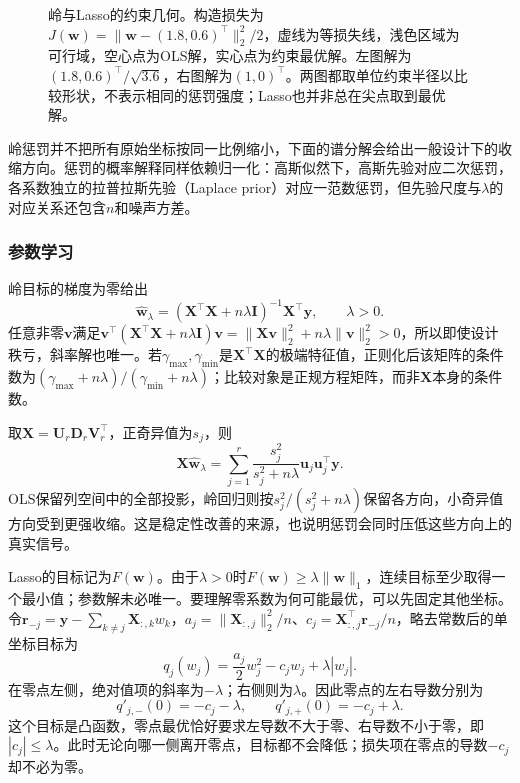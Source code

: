 \begin{figure}[t]
  \centering
  
  \caption{岭与Lasso的约束几何。构造损失为$J(\bm{w})=\lVert\bm{w}-(1.8,0.6)^{\top}\rVert_2^2/2$，虚线为等损失线，浅色区域为可行域，空心点为OLS解，实心点为约束最优解。左图解为$(1.8,0.6)^{\top}/\sqrt{3.6}$，右图解为$(1,0)^{\top}$。两图都取单位约束半径以比较形状，不表示相同的惩罚强度；Lasso也并非总在尖点取到最优解。}
  \label{fig:regression-regularization-geometry}
\end{figure}

岭惩罚并不把所有原始坐标按同一比例缩小，下面的谱分解会给出一般设计下的收缩方向。惩罚的概率解释同样依赖归一化：高斯似然下，高斯先验对应二次惩罚，各系数独立的拉普拉斯先验（Laplace prior）对应一范数惩罚，但先验尺度与$\lambda$的对应关系还包含$n$和噪声方差。

\subsubsection{参数学习}
\label{sec:regression-regularization-learning}

岭目标的梯度为零给出
\begin{equation}
  \widehat{\bm{w}}_{\lambda}
  =(\bm{X}^{\top}\bm{X}+n\lambda\bm{I})^{-1}\bm{X}^{\top}\bm{y},
  \qquad\lambda>0.
  \label{eq:regression-ridge-solution}
\end{equation}
任意非零$\bm{v}$满足$\bm{v}^{\top}(\bm{X}^{\top}\bm{X}+n\lambda\bm{I})\bm{v}=\lVert\bm{X}\bm{v}\rVert_2^2+n\lambda\lVert\bm{v}\rVert_2^2>0$，所以即使设计秩亏，斜率解也唯一。若$\gamma_{\max},\gamma_{\min}$是$\bm{X}^{\top}\bm{X}$的极端特征值，正则化后该矩阵的条件数为$(\gamma_{\max}+n\lambda)/(\gamma_{\min}+n\lambda)$；比较对象是正规方程矩阵，而非$\bm{X}$本身的条件数。

取$\bm{X}=\bm{U}_r\bm{D}_r\bm{V}_r^{\top}$，正奇异值为$s_j$，则
\begin{equation}
  \bm{X}\widehat{\bm{w}}_{\lambda}
  =\sum_{j=1}^{r}\frac{s_j^2}{s_j^2+n\lambda}
       \bm{u}_j\bm{u}_j^{\top}\bm{y}.
  \label{eq:regression-ridge-spectral}
\end{equation}
OLS保留列空间中的全部投影，岭回归则按$s_j^2/(s_j^2+n\lambda)$保留各方向，小奇异值方向受到更强收缩。这是稳定性改善的来源，也说明惩罚会同时压低这些方向上的真实信号。

Lasso的目标记为$F(\bm{w})$。由于$\lambda>0$时$F(\bm{w})\geq\lambda\lVert\bm{w}\rVert_1$，连续目标至少取得一个最小值；参数解未必唯一。要理解零系数为何可能最优，可以先固定其他坐标。令$\bm{r}_{-j}=\bm{y}-\sum_{k\ne j}\bm{X}_{:,k}w_k$，$a_j=\lVert\bm{X}_{:,j}\rVert_2^2/n$、$c_j=\bm{X}_{:,j}^{\top}\bm{r}_{-j}/n$，略去常数后的单坐标目标为
\[
  q_j(w_j)=\frac{a_j}{2}w_j^2-c_jw_j+\lambda|w_j|.
\]
在零点左侧，绝对值项的斜率为$-\lambda$；右侧则为$\lambda$。因此零点的左右导数分别为
\[
  q'_{j,-}(0)=-c_j-\lambda,\qquad
  q'_{j,+}(0)=-c_j+\lambda.
\]
这个目标是凸函数，零点最优恰好要求左导数不大于零、右导数不小于零，即$|c_j|\leq\lambda$。此时无论向哪一侧离开零点，目标都不会降低；损失项在零点的导数$-c_j$却不必为零。

